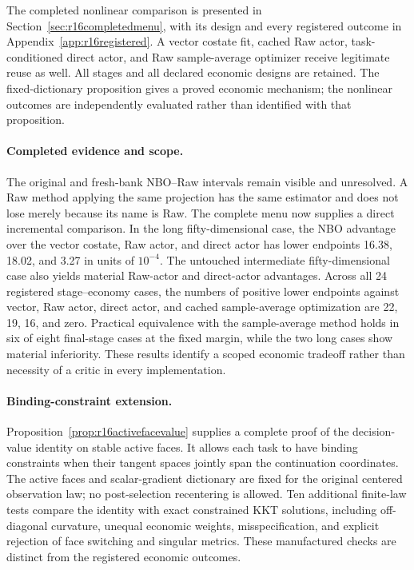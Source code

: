 The completed nonlinear comparison is presented in Section~\ref{sec:r16completedmenu}, with its design and every registered outcome in Appendix~\ref{app:r16registered}. A vector costate fit, cached Raw actor, task-conditioned direct actor, and Raw sample-average optimizer receive legitimate reuse as well. All stages and all declared economic designs are retained. The fixed-dictionary proposition gives a proved economic mechanism; the nonlinear outcomes are independently evaluated rather than identified with that proposition.

\paragraph*{Completed evidence and scope.} The original and fresh-bank NBO--Raw intervals remain visible and unresolved. A Raw method applying the same projection has the same estimator and does not lose merely because its name is Raw. The complete menu now supplies a direct incremental comparison. In the long fifty-dimensional case, the NBO advantage over the vector costate, Raw actor, and direct actor has lower endpoints 16.38, 18.02, and 3.27 in units of $10^{-4}$. The untouched intermediate fifty-dimensional case also yields material Raw-actor and direct-actor advantages. Across all 24 registered stage--economy cases, the numbers of positive lower endpoints against vector, Raw actor, direct actor, and cached sample-average optimization are 22, 19, 16, and zero. Practical equivalence with the sample-average method holds in six of eight final-stage cases at the fixed margin, while the two long cases show material inferiority. These results identify a scoped economic tradeoff rather than necessity of a critic in every implementation.

\paragraph*{Binding-constraint extension.} Proposition~\ref{prop:r16activefacevalue} supplies a complete proof of the decision-value identity on stable active faces. It allows each task to have binding constraints when their tangent spaces jointly span the continuation coordinates. The active faces and scalar-gradient dictionary are fixed for the original centered observation law; no post-selection recentering is allowed. Ten additional finite-law tests compare the identity with exact constrained KKT solutions, including off-diagonal curvature, unequal economic weights, misspecification, and explicit rejection of face switching and singular metrics. These manufactured checks are distinct from the registered economic outcomes.

